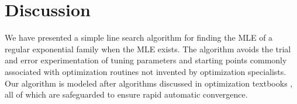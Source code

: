 \documentclass[oneside]{myumnStatThesis}
\begin{document}

\chapter{Discussion}
We have presented a simple line search algorithm for finding the MLE of a regular exponential family when the MLE 
exists.  The algorithm avoids the trial and error experimentation of tuning parameters and starting points commonly associated with optimization routines
not invented by optimization specialists.  Our algorithm is modeled after algorithms discussed in optimization textbooks \citep{Fletcher,NW,Sun:2006},
all of which are safeguarded to ensure rapid automatic convergence.
\end{document}
